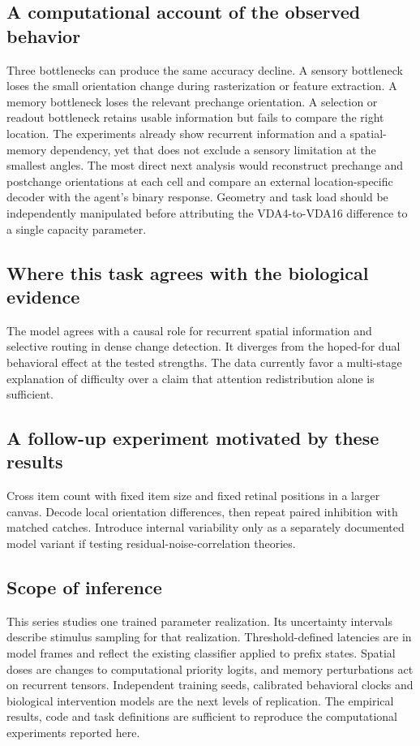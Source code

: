 \documentclass[11pt]{article}
\begin{document}
\subsection{A computational account of the observed behavior}
Three bottlenecks can produce the same accuracy decline. A sensory bottleneck loses the small orientation change during rasterization or feature extraction. A memory bottleneck loses the relevant prechange orientation. A selection or readout bottleneck retains usable information but fails to compare the right location. The experiments already show recurrent information and a spatial-memory dependency, yet that does not exclude a sensory limitation at the smallest angles. The most direct next analysis would reconstruct prechange and postchange orientations at each cell and compare an external location-specific decoder with the agent’s binary response. Geometry and task load should be independently manipulated before attributing the VDA4-to-VDA16 difference to a single capacity parameter.

\subsection{Where this task agrees with the biological evidence}
The model agrees with a causal role for recurrent spatial information and selective routing in dense change detection. It diverges from the hoped-for dual behavioral effect at the tested strengths. The data currently favor a multi-stage explanation of difficulty over a claim that attention redistribution alone is sufficient.

\subsection{A follow-up experiment motivated by these results}
Cross item count with fixed item size and fixed retinal positions in a larger canvas. Decode local orientation differences, then repeat paired inhibition with matched catches. Introduce internal variability only as a separately documented model variant if testing residual-noise-correlation theories.
\subsection{Scope of inference}
This series studies one trained parameter realization. Its uncertainty intervals describe stimulus sampling for that realization. Threshold-defined latencies are in model frames and reflect the existing classifier applied to prefix states. Spatial doses are changes to computational priority logits, and memory perturbations act on recurrent tensors. Independent training seeds, calibrated behavioral clocks and biological intervention models are the next levels of replication. The empirical results, code and task definitions are sufficient to reproduce the computational experiments reported here.
\end{document}
